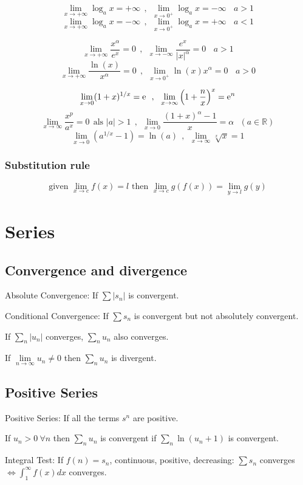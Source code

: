 \[
\lim_{x\rightarrow+\infty}\log_ax=+\infty ~~,~~ \lim_{x\rightarrow0^+}\log_ax=-\infty ~~~~ a>1
\]
\[
\lim_{x\rightarrow+\infty}\log_ax=-\infty ~~,~~ \lim_{x\rightarrow0^+}\log_ax=+\infty ~~~~ a<1
\]

\[
\lim_{x\rightarrow+\infty}\frac{x^\alpha}{e^x}=0 ~~,~~ \lim_{x\rightarrow-\infty}\frac{e^x}{\left|x\right|^\alpha}=0 ~~~~ a>1
\]
\[
\lim_{x\rightarrow+\infty}\frac{\ln(x)}{x^\alpha}=0 ~~,~~ \lim_{x\rightarrow 0^+}\ln(x)x^\alpha=0 ~~~~ a>0
\]


\[
\lim_{x\rightarrow0}(1+x)^{1/x}={\rm e}~~,~~
\lim_{x\rightarrow\infty}\left(1+\frac{n}{x}\right)^x={\rm e}^n
\]
\[
\lim_{x\rightarrow\infty}\frac{x^p}{a^x}=0~~\mbox{als }|a|>1 ~~,~~
\lim_{x\rightarrow0}\frac{(1+x)^\alpha-1}{x}=\alpha ~~~ (a\in\mathbb{R})
\]
\[
\lim_{x\rightarrow0}\left(a^{1/x}-1\right)=\ln(a)~~,~~
\lim_{x\rightarrow\infty}\sqrt[x]{x}=1
\]

\subsubsection{Substitution rule}
\[
\text{given  } \lim_{x\rightarrow c}f(x)=l \text{   then   } \lim_{x\rightarrow c}g(f(x))=\lim_{y\rightarrow l}g(y) 
\]

\section{Series}
\subsection{Convergence and divergence}
Absolute Convergence: If $\sum\left|s_n\right|$ is convergent.

Conditional Convergence: If $\sum s_n$ is convergent but not absolutely convergent.

If $\sum\limits_n|u_n|$ converges, $\sum\limits_n u_n$ also converges.

If $\lim\limits_{n\rightarrow\infty}u_n\neq0$ then $\sum\limits_n u_n$ is divergent.

\subsection{Positive Series}
Positive Series: If all the terms $ s^n $ are positive.

If $u_n>0~\forall n$ then $\sum\limits_n u_n$ is convergent if 
$\sum\limits_n\ln(u_n+1)$ is convergent.

Integral Test: If $ f(n) = s_n $, continuous, positive, decreasing: $\sum s_n$ converges $ \Leftrightarrow \int_{1}^{\infty}f(x)dx $ converges.

